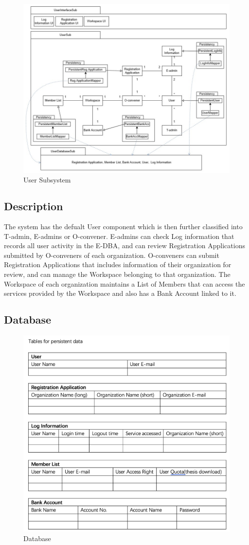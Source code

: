 \begin{figure}[H]
    \centering
    \includegraphics[width=0.75\linewidth]{picture/3-1/3-1-1.png}
    \caption{User Subsystem}
    \label{fig:enter-label}
\end{figure}

\subsection{Description}

The system has the defualt User component which is then further classified into T-admin, E-admins or O-convener. E-admins can check Log information that records all user activity in the E-DBA, and can review Registration Applications submitted by O-conveners of each organization. O-conveners can submit Registration Applications that includes information of their organization for review, and can manage the Workspace belonging to that organization. The Workspace of each organization maintains a List of Members that can access the services provided by the Workspace and also has a Bank Account linked to it.

\subsection{Database}
\begin{figure}[H]
    \centering
    \includegraphics[width=0.75\linewidth]{picture/3-1/3-1-2.png}
    \caption{Database}
    \label{fig:enter-label}
\end{figure}

